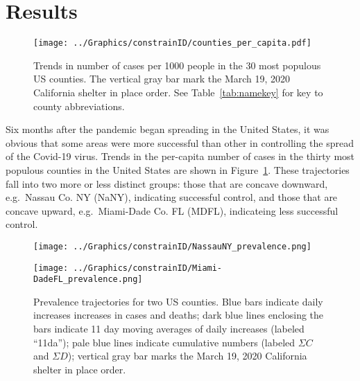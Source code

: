 \documentclass[12pt,letterpaper]{article}
\newcommand\EG{e.g.\ }
\begin{document}
\section*{Results}

\begin{figure}[h!]
\begin{center}
\texttt{[image: ../Graphics/constrainID/counties\_per\_capita.pdf]}
\end{center}
\caption{\label{fig:percap}
Trends in number of cases per 1000 people in the 30 most populous US
counties.
The vertical gray bar mark the March 19, 2020 California shelter in place order.
See Table~\ref{tab:namekey} for key to county abbreviations.
}
\end{figure}


Six months after the pandemic began spreading in the United States, it
was obvious that some areas were more successful than other
in controlling the spread of the Covid-19 virus.
Trends in the per-capita number of cases in the thirty most populous 
counties in the
United States are shown in Figure~\ref{fig:percap}.
These trajectories fall into two more or less distinct groups: those
that are concave downward, \EG Nassau Co. NY (NaNY), indicating
successful control, and those that are
concave upward, \EG Miami-Dade Co. FL (MDFL), indicateing less
successful control.


\begin{figure}
{\scriptsize
\begin{center}
\texttt{[image: ../Graphics/constrainID/NassauNY\_prevalence.png]}
 
\vspace{0.25truein}

\texttt{[image: ../Graphics/constrainID/Miami-DadeFL\_prevalence.png]}
\end{center}
}
\caption{\label{fig:prev}
Prevalence trajectories for two US counties.
Blue bars indicate daily increases increases in cases and deaths;
dark blue lines enclosing the bars indicate 11 day moving averages of
daily increases (labeled ``11da'');
pale blue lines indicate cumulative numbers (labeled $\Sigma C$ and
$\Sigma D$); 
vertical gray bar marks the March 19, 2020 California shelter in place order.
}
\end{figure}
\end{document}
